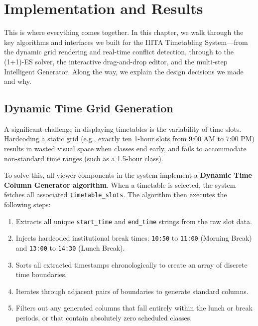 ﻿%

\chapter{Implementation and Results} %

\label{Chapter5} %


This is where everything comes together. In this chapter, we walk through the key algorithms and interfaces we built for the IIITA Timetabling System---from the dynamic grid rendering and real-time conflict detection, through to the (1+1)-ES solver, the interactive drag-and-drop editor, and the multi-step Intelligent Generator. Along the way, we explain the design decisions we made and why.

\section{Dynamic Time Grid Generation}

A significant challenge in displaying timetables is the variability of time slots. Hardcoding a static grid (e.g., exactly ten 1-hour slots from 9:00 AM to 7:00 PM) results in wasted visual space when classes end early, and fails to accommodate non-standard time ranges (such as a 1.5-hour class).

To solve this, all viewer components in the system implement a \textbf{Dynamic Time Column Generator algorithm}.
When a timetable is selected, the system fetches all associated \texttt{timetable\_slots}. The algorithm then executes the following steps:
\begin{enumerate}
    \item Extracts all unique \texttt{start\_time} and \texttt{end\_time} strings from the raw slot data.
    \item Injects hardcoded institutional break times: \texttt{10:50} to \texttt{11:00} (Morning Break) and \texttt{13:00} to \texttt{14:30} (Lunch Break).
    \item Sorts all extracted timestamps chronologically to create an array of discrete time boundaries.
    \item Iterates through adjacent pairs of boundaries to generate standard columns.
    \item Filters out any generated columns that fall entirely within the lunch or break periods, or that contain absolutely zero scheduled classes.
\end{enumerate}

